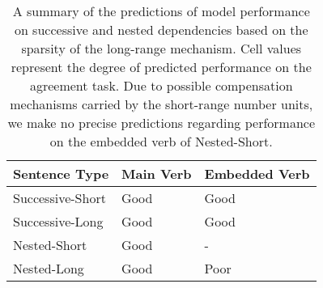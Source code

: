 \begin{table}[!htbp]
\centering
\begin{tabular}{|P{3.5cm}||P{3.5cm}|P{3.5cm}|}
    \hline
    \B Sentence Type & \B Main Verb & \B Embedded Verb \\
    \hline
    Successive-Short & Good  & Good \\
    \hline
    Successive-Long & Good & Good \\
    \hline
    Nested-Short & Good & - \\
    \hline
    Nested-Long & Good & Poor \\
    \hline
\end{tabular}
\caption{A summary of the predictions of model performance on successive and nested dependencies based on the sparsity of the long-range mechanism. Cell values represent the degree of predicted performance on the agreement task. Due to possible compensation mechanisms carried by the short-range number units, we make no precise predictions regarding performance on the embedded verb of Nested-Short.}
\label{tbl:predictions}
\end{table}